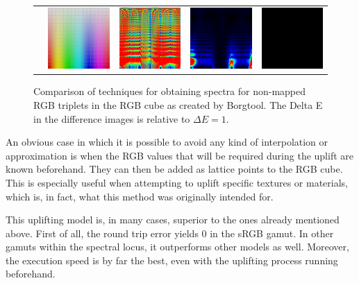 \begin{figure}[t]
{\begin{tabular}{ccccc}
			& 
			\includegraphics[width=.21\textwidth]{img/uplifting_texture_original.png}
			&\hspace{0.5em}
			\includegraphics[width=.21\textwidth]{img/uplifting_diff_originalNeighbor.png}
			& 
			\includegraphics[width=.21\textwidth]{img/uplifting_diff_originalCoef.png}
			& 
			\includegraphics[width=.21\textwidth]{img/uplifting_diff_originalSpectra.png}\\
		\end{tabular}
	}
	\caption{Comparison of techniques for obtaining spectra for non-mapped RGB triplets in the RGB cube as created by Borgtool. The Delta E in the difference images is relative to $\Delta E = 1$.}
	\label{fig:sigmoidTexture}
\end{figure}

An obvious case in which it is possible to avoid any kind of interpolation or approximation is when the RGB values that will be required during the uplift are known beforehand. They can then be added as lattice points to the RGB cube. This is especially useful when attempting to uplift specific textures or materials, which is, in fact, what this method was originally intended for.

This uplifting model is, in many cases, superior to the ones already mentioned above. First of all, the round trip error yields 0 in the sRGB gamut. In other gamuts within the spectral locus, it outperforms other models as well. Moreover, the execution speed is by far the best, even with the uplifting process running beforehand. 


